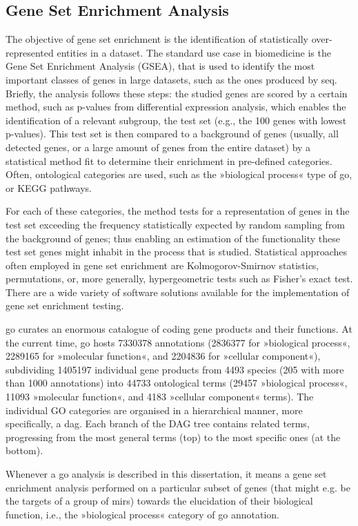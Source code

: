 \begin{method}
\subsection{Gene Set Enrichment Analysis} \label{sec:database:gsea}
The objective of gene set enrichment is the identification of statistically over-represented entities in a dataset. The standard use case in biomedicine is the Gene Set Enrichment Analysis (GSEA), that is used to identify the most important classes of genes in large datasets, such as the ones produced by \ac{seq}. Briefly, the analysis follows these steps: the studied genes are scored by a certain method, such as p-values from differential expression analysis, which enables the identification of a relevant subgroup, the test set (e.g., the 100 genes with lowest p-values). This test set is then compared to a background of genes (usually, all detected genes, or a large amount of genes from the entire dataset) by a statistical method fit to determine their enrichment in pre-defined categories. Often, ontological categories are used, such as the »biological process« type of \ac{go}, or KEGG pathways.

For each of these categories, the method tests for a representation of genes in the test set exceeding the frequency statistically expected by random sampling from the background of genes; thus enabling an estimation of the functionality these test set genes might inhabit in the process that is studied. Statistical approaches often employed in gene set enrichment are Kolmogorov-Smirnov statistics, permutations, or, more generally, hypergeometric tests such as Fisher's exact test. There are a wide variety of software solutions available for the implementation of gene set enrichment testing.

\acl{go} curates an enormous catalogue of coding gene products and their functions. At the current time, \ac{go} hosts \num{7330378} annotations (\num{2836377} for »biological process«, \num{2289165} for »molecular function«, and \num{2204836} for »cellular component«), subdividing \num{1405197} individual gene products from \num{4493} species (\num{205} with more than \num{1000} annotations) into \num{44733} ontological terms (\num{29457} »biological process«, \num{11093} »molecular function«, and \num{4183} »cellular component« terms). The individual GO categories are organised in a hierarchical manner, more specifically, a \ac{dag}. Each branch of the DAG tree contains related terms, progressing from the most general terms (top) to the most specific ones (at the bottom). 

Whenever a \ac{go} analysis is described in this dissertation, it means a gene set enrichment analysis performed on a particular subset of genes (that might e.g. be the targets of a group of \acp{mir}) towards the elucidation of their biological function, i.e., the »biological process« category of \ac{go} annotation.

\end{method}
